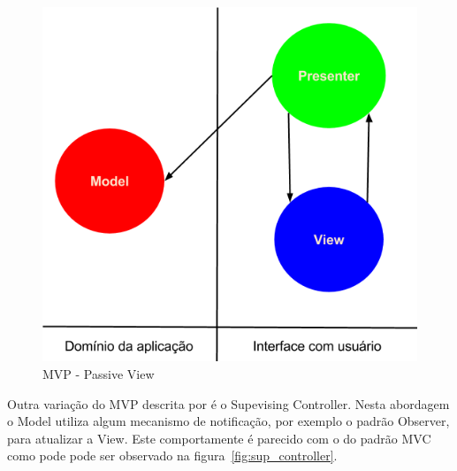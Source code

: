 \begin{figure}[htb]
	\caption{\label{fig:mvp_passive_view} MVP - Passive View}
	\begin{center}
		\includegraphics[scale=0.5]{img/passive_view.png}
	\end{center}
\end{figure}

Outra variação do MVP descrita por  é o Supevising
Controller. Nesta abordagem o Model utiliza algum mecanismo de notificação, por
exemplo o padrão Observer, para atualizar a View. Este comportamente é parecido
com o do padrão MVC como pode pode ser observado na
figura~\ref{fig:sup_controller}.

